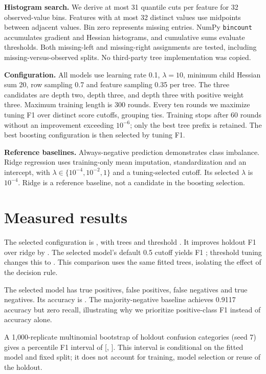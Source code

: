 \documentclass[10pt,a4paper]{article}
\begin{document}
\textbf{Histogram search.} We derive at most 31 quantile cuts per feature for 32 observed-value bins. Features with at most 32 distinct values use midpoints between adjacent values. Bin zero represents missing entries. NumPy \texttt{bincount} accumulates gradient and Hessian histograms, and cumulative sums evaluate thresholds. Both missing-left and missing-right assignments are tested, including missing-versus-observed splits. No third-party tree implementation was copied.

\textbf{Configuration.} All models use learning rate 0.1, $\lambda=10$, minimum child Hessian sum 20, row sampling 0.7 and feature sampling 0.35 per tree. The three candidates are depth two, depth three, and depth three with positive weight three. Maximum training length is 300 rounds. Every ten rounds we maximize tuning F1 over distinct score cutoffs, grouping ties. Training stops after 60 rounds without an improvement exceeding $10^{-6}$; only the best tree prefix is retained. The best boosting configuration is then selected by tuning F1.

\textbf{Reference baselines.} Always-negative prediction demonstrates class imbalance. Ridge regression uses training-only mean imputation, standardization and an intercept, with $\lambda\in\{10^{-4},10^{-2},1\}$ and a tuning-selected cutoff. Its selected $\lambda$ is $10^{-4}$. Ridge is a reference baseline, not a candidate in the boosting selection.

\newpage
\section{Measured results}

The selected configuration is \Chosen{}, with \Rounds{} trees and threshold \Threshold{}. It improves holdout F1 over ridge by \Gain{}. The selected model's default 0.5 cutoff yields F1 \DefaultF{}; threshold tuning changes this to \HoldF{}. This comparison uses the same fitted trees, isolating the effect of the decision rule.

The selected model has \TP{} true positives, \FP{} false positives, \FN{} false negatives and \TN{} true negatives. Its accuracy is \Accuracy{}. The majority-negative baseline achieves 0.9117 accuracy but zero recall, illustrating why we prioritize positive-class F1 instead of accuracy alone.

A 1,000-replicate multinomial bootstrap of holdout confusion categories (seed 7) gives a percentile F1 interval of [\CIL{}, \CIH{}]. This interval is conditional on the fitted model and fixed split; it does not account for training, model selection or reuse of the holdout.
\end{document}
